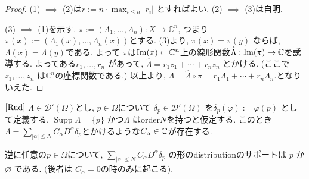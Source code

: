 \begin{proof}
(1) \(\implies\) (2)は\(r := n \cdot \max_{i\le n}|r_i|\) とすればよい.  
(2) \(\implies\) (3)は自明.

(3) \(\implies\) (1)を示す. 
\(\pi :=(\Lambda_1,\dots,\Lambda_n): X \to \mathbb{C}^n\), つまり$\pi(x):=(\Lambda_1(x), \dots, \Lambda_n(x))$とする. 
(3)より,  \(\pi(x) = \pi(y)\) ならば,  \(\Lambda(x) = \Lambda(y)\)である.
よって $\pi$は$\operatorname{Im}(\pi)  \subset \mathbb{C}^n$上の線形関数\(\hat{\Lambda} : \operatorname{Im}(\pi)  \to \mathbb{C} \)を誘導する. 
よってある\( r_1,\dots,r_n\) があって, 
\(\hat{\Lambda} = r_1 z_1 + \cdots + r_n z_n\) とかける. (ここで\(z_1,\dots,z_n\) は\(\mathbb{C}^n\)の座標関数である.)
以上より, \( \Lambda = \hat{\Lambda} \circ \pi = r_1 \Lambda_1 + \cdots + r_n \Lambda_n.\)となりいえた. 
\end{proof}


\begin{tcolorbox}[mybox]
\begin{thm}{$\cite[Thm 6.25]{Rud}$}
\label{thm-H-2.2}
\(\Lambda \in \mathcal{D}'(\Omega)\)とし, \(p \in \Omega\)について
\(\delta_p \in \mathcal{D}'(\Omega)\) を\(\delta_p(\varphi) := \varphi(p)\) として定義する. 
\(\operatorname{Supp}\Lambda = \{p\}\) かつ\(\Lambda\) はorder\(N\)を持つと仮定する. 
このとき\(\Lambda = \sum_{|\alpha|\le N} C_\alpha D^\alpha \delta_p\)とかけるような$C_\alpha \in \mathbb{C}$が存在する. 

逆に任意の\(p \in \Omega\)について,  \(\sum_{|\alpha|\le N} C_\alpha D^\alpha \delta_p\)  
の形のdistributionのサポートは \(p\) か \(\varnothing\) である. $($後者は \(C_\alpha = 0\)の時のみに起こる$)$.  
\end{thm}
\end{tcolorbox}

